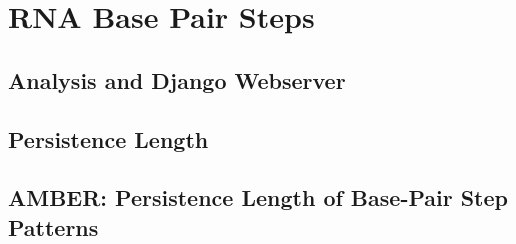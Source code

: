 \chapter{RNA Base Pair Steps}
\label{basepairsteps} 

\section{Analysis and Django Webserver}
\section{Persistence Length}
\section{AMBER: Persistence Length of Base-Pair Step Patterns}


